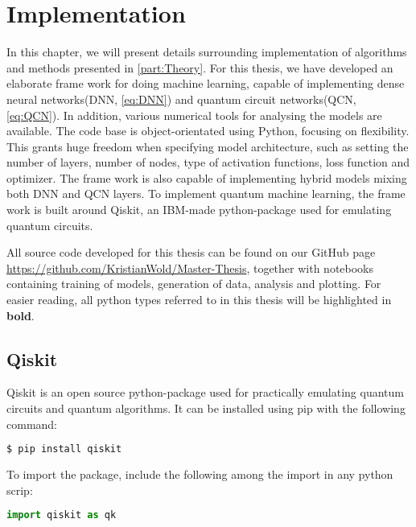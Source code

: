 \chapter{Implementation}\label{chap:implementation}
In this chapter, we will present details surrounding implementation of algorithms and methods presented in \autoref{part:Theory}. For this thesis, we have developed an elaborate frame work for doing machine learning, capable of implementing dense neural networks(DNN, \autoref{eq:DNN}) and quantum circuit networks(QCN, \autoref{eq:QCN}). In addition, various numerical tools for analysing the models are available. The code base is object-orientated using Python, focusing on flexibility. This grants huge freedom when specifying model architecture, such as setting the number of layers, number of nodes, type of activation functions, loss function and optimizer. The frame work is also capable of implementing hybrid models mixing both DNN and QCN layers. To implement quantum machine learning, the frame work is built around Qiskit\cite{Qiskit}, an IBM-made python-package used for emulating quantum circuits. 

All source code developed for this thesis can be found on our GitHub page \url{https://github.com/KristianWold/Master-Thesis}, together with notebooks containing training of models, generation of data, analysis and plotting. For easier reading, all python types referred to in this thesis will be highlighted in \textbf{bold}.

\section{Qiskit}\label{sec:Qiskit}

Qiskit\cite{Qiskit} is an open source python-package used for practically emulating quantum circuits and quantum algorithms. It can be installed using pip with the following command:

\begin{lstlisting}[language=bash]
  $ pip install qiskit
\end{lstlisting}
To import the package, include the following among the import in any python scrip:
\begin{lstlisting}[language=python]
  import qiskit as qk
\end{lstlisting}

